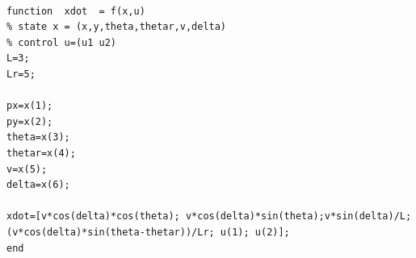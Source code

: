 \documentclass{article}
\begin{document}
\bigskip

\noindent
    \begin{tcolorbox}[
        title={File \texttt{car\_trailer\_f.m}},
        width=13cm,
    ]
    
\begin{scriptsize}
\begin{verbatim}

function  xdot  = f(x,u)
% state x = (x,y,theta,thetar,v,delta)
% control u=(u1 u2)
L=3;
Lr=5;

px=x(1);
py=x(2);
theta=x(3);
thetar=x(4);
v=x(5);
delta=x(6);

xdot=[v*cos(delta)*cos(theta); v*cos(delta)*sin(theta);v*sin(delta)/L;
(v*cos(delta)*sin(theta-thetar))/Lr; u(1); u(2)];
end

\end{verbatim}
\end{scriptsize}
\end{tcolorbox}









\bigskip
\end{document}
